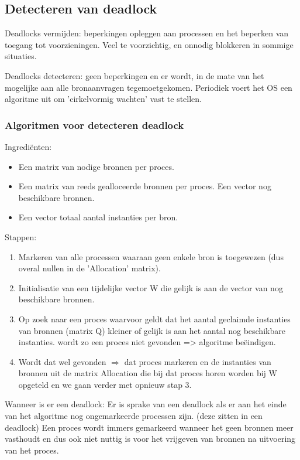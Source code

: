 \subsection{Detecteren van deadlock}

Deadlocks vermijden: beperkingen opleggen aan processen en het beperken van toegang tot voorzieningen. Veel te voorzichtig, en onnodig blokkeren in sommige situaties.

Deadlocks detecteren: geen beperkingen en er wordt, in de mate van het mogelijke aan alle bronaanvragen tegemoetgekomen. Periodiek voert het OS een algoritme uit om 'cirkelvormig wachten' vast te stellen.

\subsubsection{Algoritmen voor detecteren deadlock}

Ingrediënten:

\begin{itemize}
\item Een matrix van nodige bronnen per proces.
\item Een matrix van reeds gealloceerde bronnen per proces. Een vector nog beschikbare bronnen.
\item Een vector totaal aantal instanties per bron.
\end{itemize}

Stappen:

\begin{enumerate}
\item Markeren van alle processen waaraan geen enkele bron is toegewezen (dus overal nullen in de 'Allocation' matrix).
\item Initialisatie van een tijdelijke vector W die gelijk is aan de vector van nog beschikbare bronnen.
\item Op zoek naar een proces waarvoor geldt dat het aantal geclaimde instanties van bronnen (matrix Q) kleiner of gelijk is aan het aantal nog beschikbare instanties. wordt zo een proces niet gevonden => algoritme beëindigen.
\item Wordt dat wel gevonden $\Rightarrow$ dat proces markeren en de instanties van bronnen uit de matrix Allocation die bij dat proces horen worden bij W opgeteld en we gaan verder met opnieuw stap 3.
\end{enumerate}

Wanneer is er een deadlock: Er is sprake van een deadlock als er aan het einde van het algoritme nog ongemarkeerde processen zijn. (deze zitten in een deadlock) Een proces wordt immers gemarkeerd wanneer het geen bronnen meer vasthoudt en dus ook niet nuttig is voor het vrijgeven van bronnen na uitvoering van het proces.

